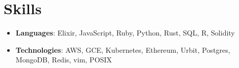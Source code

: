 \documentclass[letterpaper,11pt]{article}
\newcommand{\resumeSubHeadingListStart}{\begin{itemize}[leftmargin=*]}
\newcommand{\resumeSubHeadingListEnd}{\end{itemize}}
\begin{document}
%
\section{Skills}
  \resumeSubHeadingListStart
    \item{
      \textbf{Languages}{: Elixir, JavaScript, Ruby, Python, Rust, SQL, R, Solidity}
    }
    \item{
      \textbf{Technologies}{: AWS, GCE, Kubernetes, Ethereum, Urbit, Postgres, MongoDB, Redis, vim, POSIX}
    }
  \resumeSubHeadingListEnd


\end{document}
